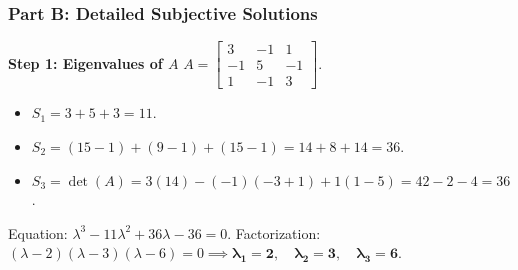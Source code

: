 \subsubsection*{Part B: Detailed Subjective Solutions}

\begin{solutionbox}
\textbf{Step 1: Eigenvalues of $A$}
$A = \begin{bmatrix} 3 & -1 & 1 \\ -1 & 5 & -1 \\ 1 & -1 & 3 \end{bmatrix}$.
\begin{itemize}[leftmargin=6mm]
    \item $S_1 = 3 + 5 + 3 = 11$.
    \item $S_2 = (15 - 1) + (9 - 1) + (15 - 1) = 14 + 8 + 14 = 36$.
    \item $S_3 = \det(A) = 3(14) - (-1)(-3 + 1) + 1(1 - 5) = 42 - 2 - 4 = 36$.
\end{itemize}
Equation: $\lambda^3 - 11\lambda^2 + 36\lambda - 36 = 0$.
Factorization: $(\lambda - 2)(\lambda - 3)(\lambda - 6) = 0 \implies \mathbf{\lambda_1 = 2, \quad \lambda_2 = 3, \quad \lambda_3 = 6}$.


\end{solutionbox}
